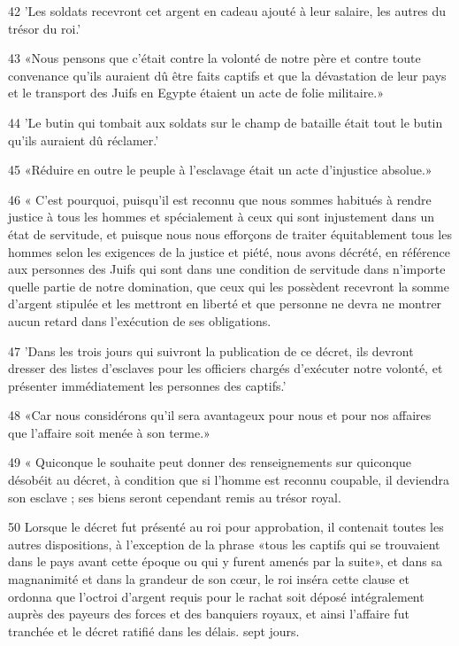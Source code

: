 \par 42 'Les soldats recevront cet argent en cadeau ajouté à leur salaire, les autres du trésor du roi.'

\par 43 «Nous pensons que c'était contre la volonté de notre père et contre toute convenance qu'ils auraient dû être faits captifs et que la dévastation de leur pays et le transport des Juifs en Egypte étaient un acte de folie militaire.»

\par 44 'Le butin qui tombait aux soldats sur le champ de bataille était tout le butin qu'ils auraient dû réclamer.'

\par 45 «Réduire en outre le peuple à l'esclavage était un acte d'injustice absolue.»

\par 46 « C'est pourquoi, puisqu'il est reconnu que nous sommes habitués à rendre justice à tous les hommes et spécialement à ceux qui sont injustement dans un état de servitude, et puisque nous nous efforçons de traiter équitablement tous les hommes selon les exigences de la justice et piété, nous avons décrété, en référence aux personnes des Juifs qui sont dans une condition de servitude dans n'importe quelle partie de notre domination, que ceux qui les possèdent recevront la somme d'argent stipulée et les mettront en liberté et que personne ne devra ne montrer aucun retard dans l'exécution de ses obligations.

\par 47 'Dans les trois jours qui suivront la publication de ce décret, ils devront dresser des listes d'esclaves pour les officiers chargés d'exécuter notre volonté, et présenter immédiatement les personnes des captifs.'

\par 48 «Car nous considérons qu'il sera avantageux pour nous et pour nos affaires que l'affaire soit menée à son terme.»

\par 49 « Quiconque le souhaite peut donner des renseignements sur quiconque désobéit au décret, à condition que si l'homme est reconnu coupable, il deviendra son esclave ; ses biens seront cependant remis au trésor royal.

\par 50 Lorsque le décret fut présenté au roi pour approbation, il contenait toutes les autres dispositions, à l'exception de la phrase «tous les captifs qui se trouvaient dans le pays avant cette époque ou qui y furent amenés par la suite», et dans sa magnanimité et dans la grandeur de son cœur, le roi inséra cette clause et ordonna que l'octroi d'argent requis pour le rachat soit déposé intégralement auprès des payeurs des forces et des banquiers royaux, et ainsi l'affaire fut tranchée et le décret ratifié dans les délais. sept jours.

